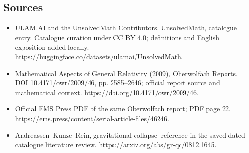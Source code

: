 \documentclass[11pt]{article}
\begin{document}
\subsection{Sources}
\begin{itemize}
\item[\hypertarget{source:statement:1}{S1}] ULAM.AI and the UnsolvedMath Contributors, UnsolvedMath, catalogue entry. Catalogue curation under CC BY 4.0; definitions and English exposition added locally.
\url{https://huggingface.co/datasets/ulamai/UnsolvedMath}.
\item[\hypertarget{source:statement:2}{S2}] Mathematical Aspects of General Relativity (2009), Oberwolfach Reports, DOI 10.4171/owr/2009/46, pp. 2585--2646; official report source and mathematical context.
\url{https://doi.org/10.4171/owr/2009/46}.
\item[\hypertarget{source:statement:3}{S3}] Official EMS Press PDF of the same Oberwolfach report; PDF page 22.
\url{https://ems.press/content/serial-article-files/46246}.
\item[\hypertarget{source:statement:4}{S4}] Andreasson--Kunze--Rein, gravitational collapse; reference in the saved dated catalogue literature review.
\url{https://arxiv.org/abs/gr-qc/0812.1645}.
\end{itemize}
\label{end:statement}
\end{document}
